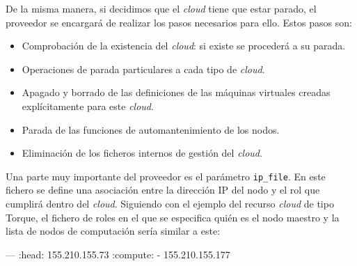De la misma manera, si decidimos que el \emph{cloud} tiene que estar parado, el proveedor se encargará de realizar los pasos necesarios para ello. Estos pasos son:

\begin{itemize}
\item Comprobación de la existencia del \emph{cloud}: si existe se procederá a su parada.
\item Operaciones de parada particulares a cada tipo de \emph{cloud}.
\item Apagado y borrado de las definiciones de las máquinas virtuales creadas explícitamente para este \emph{cloud}.
\item Parada de las funciones de automantenimiento de los nodos.
\item Eliminación de los ficheros internos de gestión del \emph{cloud}.
\end{itemize}

Una parte muy importante del proveedor es el parámetro \texttt{ip\_file}. En este fichero se define una asociación entre la dirección IP del nodo y el rol que cumplirá dentro del \emph{cloud}. Siguiendo con el ejemplo del recurso \emph{cloud} de tipo Torque, el fichero de roles en el que se especifica quién es el nodo maestro y la lista de nodos de computación sería similar a este:

\begin{yamlcode}
--- 
:head: 155.210.155.73
:compute:
- 155.210.155.177
\end{yamlcode}

